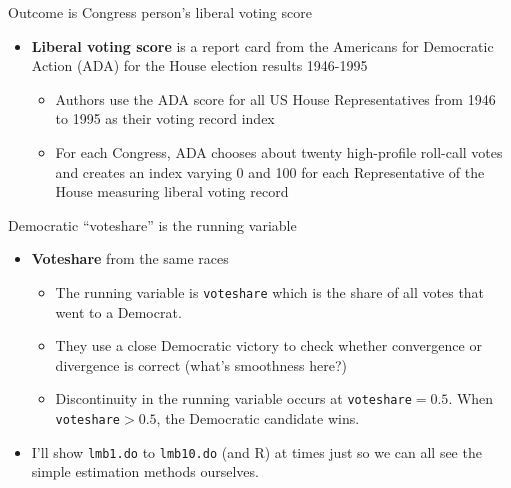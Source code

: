 \documentclass{beamer}
\begin{document}
\begin{frame}{Outcome is Congress person's liberal voting score}
	
	\begin{itemize}
	\item \textbf{Liberal voting score} is a report card from the Americans for Democratic Action (ADA) for the House election results 1946-1995
		\begin{itemize}
		\item Authors use the ADA score for all US House Representatives from 1946 to 1995 as their voting record index
		\item For each Congress, ADA chooses about twenty high-profile roll-call votes and creates an index varying 0 and 100 for each Representative of the House measuring liberal voting record
		\end{itemize}
	\end{itemize}
\end{frame}

\begin{frame}{Democratic ``voteshare'' is the running variable}

\begin{itemize}
	\item \textbf{Voteshare} from the same races
		\begin{itemize}
		\item The running variable is \texttt{voteshare} which is the share of all votes that went to a Democrat. 
		\item They use a close Democratic victory to check whether convergence or divergence is correct (what's smoothness here?)
		\item  Discontinuity in the running variable occurs at \texttt{voteshare}$=0.5$. When \texttt{voteshare}$>0.5$, the Democratic candidate wins.  
		\end{itemize}
	\item I'll show \texttt{lmb1.do} to \texttt{lmb10.do} (and R) at times just so we can all see the simple estimation methods ourselves. 
\end{itemize}

\end{frame}
\end{document}
